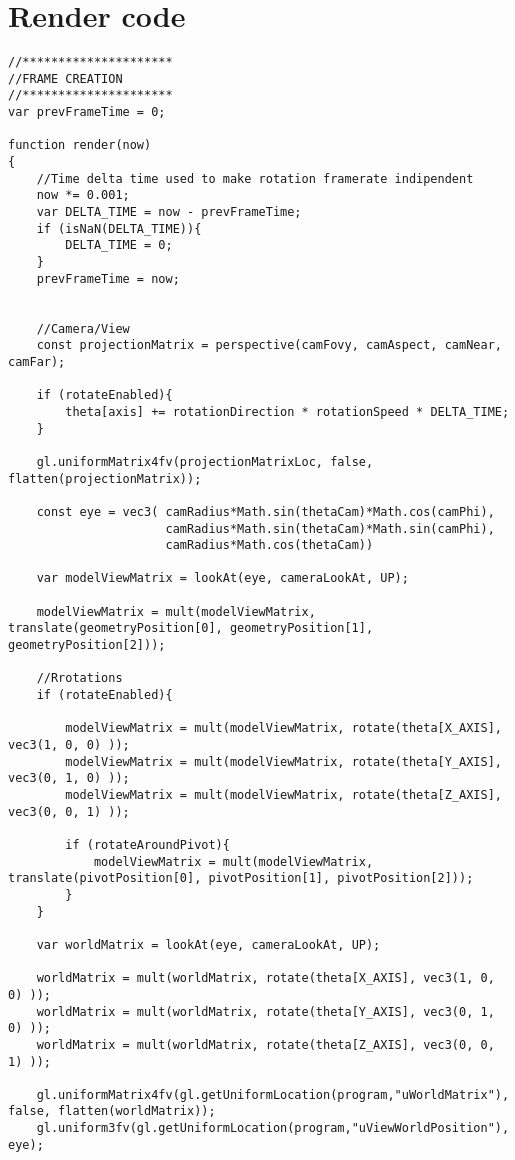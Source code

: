 \documentclass[10pt,a4paper]{article}
\begin{document}
\section{Render code}
\tiny
\begin{verbatim}
//*********************
//FRAME CREATION
//*********************
var prevFrameTime = 0;

function render(now)
{
    //Time delta time used to make rotation framerate indipendent
    now *= 0.001;
    var DELTA_TIME = now - prevFrameTime;
    if (isNaN(DELTA_TIME)){
        DELTA_TIME = 0;
    }
    prevFrameTime = now;


    //Camera/View
    const projectionMatrix = perspective(camFovy, camAspect, camNear, camFar);

    if (rotateEnabled){
        theta[axis] += rotationDirection * rotationSpeed * DELTA_TIME;
    }

    gl.uniformMatrix4fv(projectionMatrixLoc, false, flatten(projectionMatrix));

    const eye = vec3( camRadius*Math.sin(thetaCam)*Math.cos(camPhi),
                      camRadius*Math.sin(thetaCam)*Math.sin(camPhi),
                      camRadius*Math.cos(thetaCam))

    var modelViewMatrix = lookAt(eye, cameraLookAt, UP);
    
    modelViewMatrix = mult(modelViewMatrix, translate(geometryPosition[0], geometryPosition[1], geometryPosition[2]));

    //Rrotations
    if (rotateEnabled){

        modelViewMatrix = mult(modelViewMatrix, rotate(theta[X_AXIS], vec3(1, 0, 0) ));
        modelViewMatrix = mult(modelViewMatrix, rotate(theta[Y_AXIS], vec3(0, 1, 0) ));
        modelViewMatrix = mult(modelViewMatrix, rotate(theta[Z_AXIS], vec3(0, 0, 1) ));

        if (rotateAroundPivot){
            modelViewMatrix = mult(modelViewMatrix, translate(pivotPosition[0], pivotPosition[1], pivotPosition[2]));
        }
    }
    
    var worldMatrix = lookAt(eye, cameraLookAt, UP);

    worldMatrix = mult(worldMatrix, rotate(theta[X_AXIS], vec3(1, 0, 0) ));
    worldMatrix = mult(worldMatrix, rotate(theta[Y_AXIS], vec3(0, 1, 0) ));
    worldMatrix = mult(worldMatrix, rotate(theta[Z_AXIS], vec3(0, 0, 1) ));

    gl.uniformMatrix4fv(gl.getUniformLocation(program,"uWorldMatrix"), false, flatten(worldMatrix));
    gl.uniform3fv(gl.getUniformLocation(program,"uViewWorldPosition"), eye);


\end{verbatim}
\end{document}
